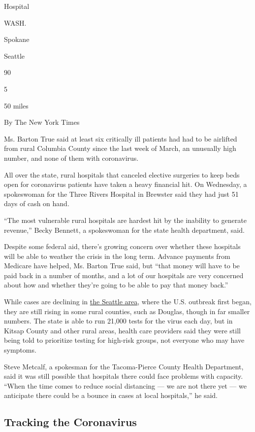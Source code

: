 Hospital

WASH.

Spokane

Seattle

90

5

50 miles

By The New York Times

Ms. Barton True said at least six critically ill patients had had to be
airlifted from rural Columbia County since the last week of March, an
unusually high number, and none of them with coronavirus.

All over the state, rural hospitals that canceled elective surgeries to
keep beds open for coronavirus patients have taken a heavy financial
hit. On Wednesday, a spokeswoman for the Three Rivers Hospital in
Brewster said they had just 51 days of cash on hand.

``The most vulnerable rural hospitals are hardest hit by the inability
to generate revenue,'' Becky Bennett, a spokeswoman for the state health
department, said.

Despite some federal aid, there's growing concern over whether these
hospitals will be able to weather the crisis in the long term. Advance
payments from Medicare have helped, Ms. Barton True said, but ``that
money will have to be paid back in a number of months, and a lot of our
hospitals are very concerned about how and whether they're going to be
able to pay that money back.''

While cases are declining in
\href{https://www.google.com/url?q=https://www.nytimes3xbfgragh.onion/2020/04/22/us/coronavirus-sequencing.html\&sa=D\&ust=1587745484219000\&usg=AFQjCNHm73DsOS6vdq1smUt9-EwTSCISig}{the
Seattle area}, where the U.S. outbreak first began, they are still
rising in some rural counties, such as Douglas, though in far smaller
numbers. The state is able to run 21,000 tests for the virus each day,
but in Kitsap County and other rural areas, health care providers said
they were still being told to prioritize testing for high-risk groups,
not everyone who may have symptoms.

Steve Metcalf, a spokesman for the Tacoma-Pierce County Health
Department, said it was still possible that hospitals there could face
problems with capacity. ``When the time comes to reduce social
distancing --- we are not there yet --- we anticipate there could be a
bounce in cases at local hospitals,'' he said.

\hypertarget{tracking-the-coronavirus}{%
\subsection{Tracking the Coronavirus}\label{tracking-the-coronavirus}}

